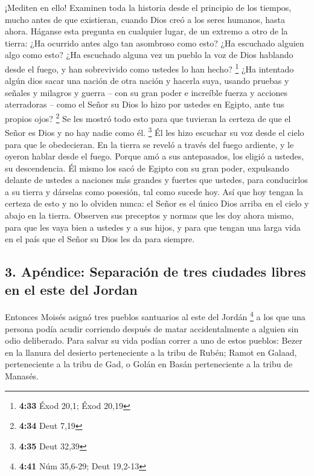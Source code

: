  ¡Mediten en ello! Examinen toda la historia desde el
principio de los tiempos, mucho antes de que existieran, cuando Dios
creó a los seres humanos, hasta ahora. Háganse esta pregunta en
cualquier lugar, de un extremo a otro de la tierra: ¿Ha ocurrido antes
algo tan asombroso como esto? ¿Ha escuchado alguien algo como esto?
 ¿Ha escuchado alguna vez un pueblo la voz de Dios
hablando desde el fuego, y han sobrevivido como ustedes lo han hecho?
\footnote{\textbf{4:33} Éxod 20,1; Éxod 20,19}  ¿Ha
intentado algún dios sacar una nación de otra nación y hacerla suya,
usando pruebas y señales y milagros y guerra -- con su gran poder e
increíble fuerza y acciones aterradoras -- como el Señor su Dios lo hizo
por ustedes en Egipto, ante tus propios ojos? \footnote{\textbf{4:34}
  Deut 7,19}  Se les mostró todo esto para que tuvieran
la certeza de que el Señor es Dios y no hay nadie como él. \footnote{\textbf{4:35}
  Deut 32,39}  Él les hizo escuchar su voz desde el cielo
para que le obedecieran. En la tierra se reveló a través del fuego
ardiente, y le oyeron hablar desde el fuego.  Porque amó
a sus antepasados, los eligió a ustedes, su descendencia. Él mismo los
sacó de Egipto con su gran poder,  expulsando delante de
ustedes a naciones más grandes y fuertes que ustedes, para conducirlos a
su tierra y dárselas como posesión, tal como sucede hoy. 
Así que hoy tengan la certeza de esto y no lo olviden nunca: el Señor es
el único Dios arriba en el cielo y abajo en la tierra. 
Observen sus preceptos y normas que les doy ahora mismo, para que les
vaya bien a ustedes y a sus hijos, y para que tengan una larga vida en
el país que el Señor su Dios les da para siempre.

\hypertarget{apuxe9ndice-separaciuxf3n-de-tres-ciudades-libres-en-el-este-del-jordan}{%
\subsection{3. Apéndice: Separación de tres ciudades libres en el este
del
Jordan}\label{apuxe9ndice-separaciuxf3n-de-tres-ciudades-libres-en-el-este-del-jordan}}

 Entonces Moisés asignó tres pueblos santuarios al este
del Jordán \footnote{\textbf{4:41} Núm 35,6-29; Deut 19,2-13}
 a los que una persona podía acudir corriendo después de
matar accidentalmente a alguien sin odio deliberado. Para salvar su vida
podían correr a uno de estos pueblos:  Bezer en la
llanura del desierto perteneciente a la tribu de Rubén; Ramot en Galaad,
perteneciente a la tribu de Gad, o Golán en Basán perteneciente a la
tribu de Manasés.

